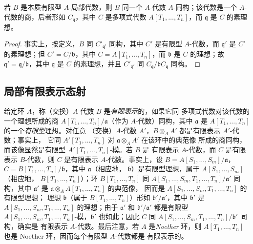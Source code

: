 \begin{proposition}[1.3.11]
\label{IV.1.3.11-fr}
若 $B$ 是本质有限型 $A$-局部代数，则 $B$ 同一个 $A$-代数
$A$-同构；该代数是一个 $A$-代数的商，后者形如 $C_{\mathfrak q}$，其中 $C$ 是多项式代数
$A[T_1,\ldots,T_n]$，而 $\mathfrak q$ 是 $C$ 的素理想。
\end{proposition}

\begin{proof}
事实上，按定义，$B$ 同 $C'_{\mathfrak q'}$ 同构，其中 $C'$ 是有限型
$A$-代数，而 $\mathfrak q'$ 是 $C'$ 的素理想；但
$C'=C/\mathfrak b$，其中 $C=A[T_1,\ldots,T_n]$，而 $\mathfrak b$ 是 $C$
的理想；故 $\mathfrak q'=\mathfrak q/\mathfrak b$，其中 $\mathfrak q$ 是
$C$ 的素理想，并且 $C'_{\mathfrak q'}$ 同
$C_{\mathfrak q}/\mathfrak bC_{\mathfrak q}$ 同构。
\end{proof}

\subsection{局部有限表示态射}
\label{subsection:IV.1.4-fr}

\begin{env}[1.4.1]
\label{IV.1.4.1-fr}
给定环 $A$，称（交换）$A$-代数 $B$ 是\emph{有限表示}的，如果它同
多项式代数对该代数的一个理想所成的商
$A[T_1,\ldots,T_n]/\mathfrak a$（作为 $A$-代数）同构，其中
$\mathfrak a$ 是 $A[T_1,\ldots,T_n]$ 的一个\emph{有限型}理想。对任意
（交换）$A$-代数 $A'$，$B\otimes_AA'$ 都是有限表示 $A'$-代数；事实上，
它同 $A'[T_1,\ldots,T_n]$ 对 $\mathfrak a\otimes_AA'$ 在该环中的典范像
所成的商同构，而该像显然是有限型 $A'[T_1,\ldots,T_n]$-模。若 $B$ 是
有限表示 $A$-代数，而 $C$ 是有限表示 $B$-代数，则 $C$ 是有限表示
$A$-代数。事实上，设
$B=A[S_1,\ldots,S_m]/\mathfrak a$，
$C=B[T_1,\ldots,T_n]/\mathfrak b$，其中 $\mathfrak a$（相应地，
$\mathfrak b$）是有限型理想，属于 $A[S_1,\ldots,S_m]$（相应地，
$B[T_1,\ldots,T_n]$）；环 $B[T_1,\ldots,T_n]$ 同
$A[S_1,\ldots,S_m,T_1,\ldots,T_n]/\mathfrak a'$ 同构，其中
$\mathfrak a'$ 是 $\mathfrak a\otimes_AA[T_1,\ldots,T_n]$ 的典范像，
因而是 $A[S_1,\ldots,S_m,T_1,\ldots,T_n]$ 的有限型理想；
理想 $\mathfrak b$（属于 $B[T_1,\ldots,T_n]$）形如
$\mathfrak b'/\mathfrak a'$，其中 $\mathfrak b'$ 是
$A[S_1,\ldots,S_m,T_1,\ldots,T_n]$ 的理想；由于 $\mathfrak a'$ 和
$\mathfrak b'/\mathfrak a'$ 都是有限型
$A[S_1,\ldots,S_m,T_1,\ldots,T_n]$-模，$\mathfrak b'$ 也如此；因此
$C$ 同 $A[S_1,\ldots,S_m,T_1,\ldots,T_n]/\mathfrak b'$ 同构，确实是
有限表示 $A$-代数。最后注意，若 $A$ 是\emph{Noether} 环，则
$A[T_1,\ldots,T_n]$ 也是 Noether 环，因而每个有限型 $A$-代数都是
有限表示的。
\end{env}

